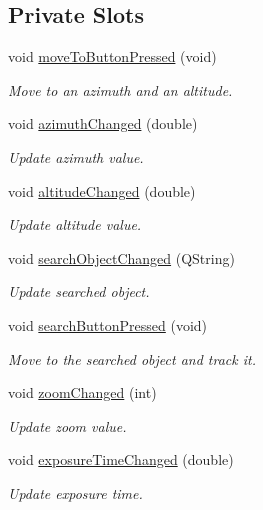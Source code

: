 \subsection*{Private Slots}
\begin{DoxyCompactItemize}
\item 
void \hyperlink{class_autoscope_window_form_a2b958095518ce01c502f912284c9e0cf}{move\+To\+Button\+Pressed} (void)
\begin{DoxyCompactList}\small\item\em Move to an azimuth and an altitude. \end{DoxyCompactList}\item 
void \hyperlink{class_autoscope_window_form_a19ceb0c2b007b8adb2a0946b7851c06f}{azimuth\+Changed} (double)
\begin{DoxyCompactList}\small\item\em Update azimuth value. \end{DoxyCompactList}\item 
void \hyperlink{class_autoscope_window_form_ab29957fd0ac7ea266fd36ce67b3eda75}{altitude\+Changed} (double)
\begin{DoxyCompactList}\small\item\em Update altitude value. \end{DoxyCompactList}\item 
void \hyperlink{class_autoscope_window_form_a44ccf2b66aa6be7495190d2bb1e62e16}{search\+Object\+Changed} (Q\+String)
\begin{DoxyCompactList}\small\item\em Update searched object. \end{DoxyCompactList}\item 
void \hyperlink{class_autoscope_window_form_a9a392b1d4b55f5c90653aa418cfa133c}{search\+Button\+Pressed} (void)
\begin{DoxyCompactList}\small\item\em Move to the searched object and track it. \end{DoxyCompactList}\item 
void \hyperlink{class_autoscope_window_form_a10578baeef8b914526da55ae8d2bddc6}{zoom\+Changed} (int)
\begin{DoxyCompactList}\small\item\em Update zoom value. \end{DoxyCompactList}\item 
void \hyperlink{class_autoscope_window_form_a2a96899ef93c00205b604c9f4d6ad8e0}{exposure\+Time\+Changed} (double)
\begin{DoxyCompactList}\small\item\em Update exposure time. \end{DoxyCompactList}\item 

\end{DoxyCompactItemize}
